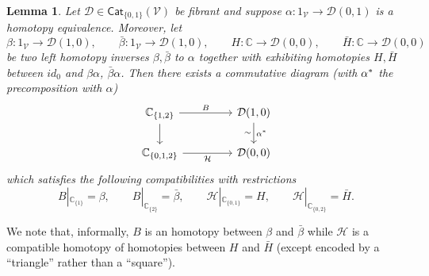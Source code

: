 \documentclass[a4paper,10pt
,draft
]{article}%
\numberwithin{equation}{section}
\numberwithin{figure}{section}
\newtheorem{lemma}[equation]{Lemma}%
\theoremstyle{definition} %
\newcommand{\V}{\ensuremath{\mathcal V}}
\newcommand{\1}{\ensuremath{\mathbbm 1}}%
\begin{document}
\begin{lemma}\label{HOMTPOFHOMTP LEM}
	Let $\mathcal{D} \in \mathsf{Cat}_{\{0,1\}}(\V)$
	be fibrant and suppose 
	$\alpha \colon 1_{\V} \to \mathcal{D}(0,1)$
	is a homotopy equivalence. 
	Moreover, let 
	\[\beta \colon 1_{\V} \to \mathcal{D}(1,0), \qquad
	\bar{\beta} \colon 1_{\V} \to \mathcal{D}(1,0),\qquad
	H \colon \mathbb{C} \to \mathcal{D}(0,0), \qquad
	\bar{H} \colon \mathbb{C} \to \mathcal{D}(0,0)
	\]
	be two left homotopy inverses $\beta,\bar{\beta}$ to $\alpha$
	together with exhibiting homotopies 
	$H,\bar{H}$
	between $id_0$ and $\beta \alpha$, $\bar{\beta}\alpha$.
	Then there exists a commutative diagram (with $\alpha^{\**}$ the precomposition with $\alpha$)
	\begin{equation}
	\begin{tikzcd}[column sep = 45pt]
	\mathbb{C}_{\{1,2\}}
	\ar{d}
	\arrow{r}{B}
	&
	\mathcal{D}(1,0)
	\arrow{d}{\alpha^{\**}}[swap]{\sim}
	\\
	\mathbb{C}_{\{0,1,2\}}
	\arrow{r}[swap]{\mathcal{H}}
	&
	\mathcal{D}(0,0)
	\end{tikzcd}
	\end{equation}
	which satisfies the following compatibilities with restrictions
	\[
	B|_{\mathbb{C}_{\{1\}}} = \beta, \qquad
	B|_{\mathbb{C}_{\{2\}}} = \bar{\beta}, \qquad
	\mathcal{H}|_{\mathbb{C}_{\{0,1\}}} = H, \qquad
	\mathcal{H}|_{\mathbb{C}_{\{0,2\}}} = \bar{H}.
	\]
\end{lemma}

We note that, informally, $B$ is an homotopy between $\beta$ and $\bar{\beta}$
while $\mathcal{H}$
is a compatible homotopy of homotopies 
between $H$ and $\bar{H}$
(except encoded by a ``triangle'' rather than a ``square'').
\end{document}
